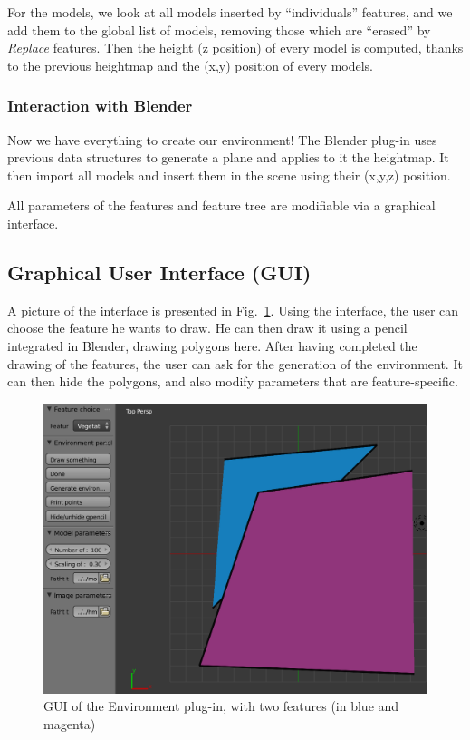 For the models, we look at all models inserted by ``individuals'' features, and we add them to the global list of models, removing those which are ``erased'' by \textit{Replace} features. Then the height (z position) of every model is computed, thanks to the previous heightmap and the (x,y) position of every models.

\subsubsection{Interaction with Blender}
Now we have everything to create our environment!
The Blender plug-in uses previous data structures to generate a plane and applies to it the heightmap. It then import all models and insert them in the scene using their (x,y,z) position.

All parameters of the features and feature tree are modifiable via a graphical interface.


\subsection{Graphical User Interface (GUI)}

A picture of the interface is presented in
Fig.~\ref{fig:env-gui1}. Using the interface, the user can choose the
feature he wants to draw. He can then draw it using a pencil
integrated in Blender, drawing polygons here. After having completed
the drawing of the features, the user can ask for the generation of
the environment. It can then hide the polygons, and also modify
parameters that are feature-specific.

\begin{figure}[h]
\includegraphics[width=\textwidth]{img/env_gui1.png}
\caption{GUI of the Environment plug-in, with two features (in blue
and magenta)}
\label{fig:env-gui1}
\end{figure}

